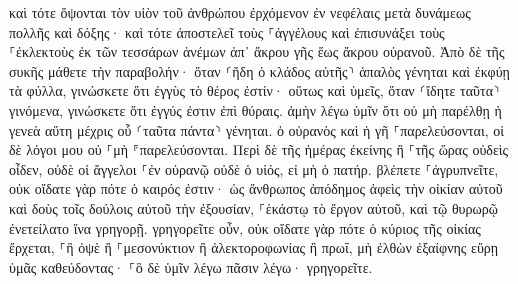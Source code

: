 \documentclass[twoside, 9pt]{extreport}
\begin{document}
καὶ τότε ὄψονται τὸν υἱὸν τοῦ ἀνθρώπου ἐρχόμενον ἐν νεφέλαις μετὰ δυνάμεως πολλῆς καὶ δόξης· 
καὶ τότε ἀποστελεῖ τοὺς ⸀ἀγγέλους καὶ ἐπισυνάξει τοὺς ⸀ἐκλεκτοὺς ἐκ τῶν τεσσάρων ἀνέμων ἀπ᾽ ἄκρου γῆς ἕως ἄκρου οὐρανοῦ. 
Ἀπὸ δὲ τῆς συκῆς μάθετε τὴν παραβολήν· ὅταν ⸂ἤδη ὁ κλάδος αὐτῆς⸃ ἁπαλὸς γένηται καὶ ἐκφύῃ τὰ φύλλα, γινώσκετε ὅτι ἐγγὺς τὸ θέρος ἐστίν· 
οὕτως καὶ ὑμεῖς, ὅταν ⸂ἴδητε ταῦτα⸃ γινόμενα, γινώσκετε ὅτι ἐγγύς ἐστιν ἐπὶ θύραις. 
ἀμὴν λέγω ὑμῖν ὅτι οὐ μὴ παρέλθῃ ἡ γενεὰ αὕτη μέχρις οὗ ⸂ταῦτα πάντα⸃ γένηται. 
ὁ οὐρανὸς καὶ ἡ γῆ ⸀παρελεύσονται, οἱ δὲ λόγοι μου οὐ ⸀μὴ ⸁παρελεύσονται. 
Περὶ δὲ τῆς ἡμέρας ἐκείνης ἢ ⸀τῆς ὥρας οὐδεὶς οἶδεν, οὐδὲ οἱ ἄγγελοι ⸀ἐν οὐρανῷ οὐδὲ ὁ υἱός, εἰ μὴ ὁ πατήρ. 
βλέπετε ⸀ἀγρυπνεῖτε, οὐκ οἴδατε γὰρ πότε ὁ καιρός ἐστιν· 
ὡς ἄνθρωπος ἀπόδημος ἀφεὶς τὴν οἰκίαν αὐτοῦ καὶ δοὺς τοῖς δούλοις αὐτοῦ τὴν ἐξουσίαν, ⸀ἑκάστῳ τὸ ἔργον αὐτοῦ, καὶ τῷ θυρωρῷ ἐνετείλατο ἵνα γρηγορῇ. 
γρηγορεῖτε οὖν, οὐκ οἴδατε γὰρ πότε ὁ κύριος τῆς οἰκίας ἔρχεται, ⸀ἢ ὀψὲ ἢ ⸀μεσονύκτιον ἢ ἀλεκτοροφωνίας ἢ πρωΐ, 
μὴ ἐλθὼν ἐξαίφνης εὕρῃ ὑμᾶς καθεύδοντας· 
⸀ὃ δὲ ὑμῖν λέγω πᾶσιν λέγω· γρηγορεῖτε. 
\end{document}
